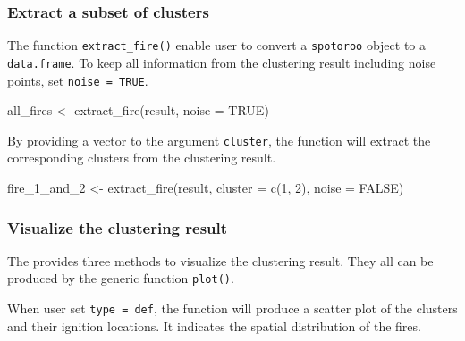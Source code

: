 \hypertarget{extract-a-subset-of-clusters}{%
\subsubsection{Extract a subset of
clusters}\label{extract-a-subset-of-clusters}}

The function \texttt{extract\_fire()} enable user to convert a
\texttt{spotoroo} object to a \texttt{data.frame}. To keep all
information from the clustering result including noise points, set
\texttt{noise\ =\ TRUE}.

\begin{Schunk}
\begin{Sinput}
all_fires <- extract_fire(result, noise = TRUE)
\end{Sinput}
\end{Schunk}

By providing a vector to the argument \texttt{cluster}, the function
will extract the corresponding clusters from the clustering result.

\begin{Schunk}
\begin{Sinput}
fire_1_and_2 <- extract_fire(result, cluster = c(1, 2), noise = FALSE)
\end{Sinput}
\end{Schunk}

\hypertarget{visualize-the-clustering-result}{%
\subsubsection{Visualize the clustering
result}\label{visualize-the-clustering-result}}

The  provides three methods to visualize the
clustering result. They all can be produced by the generic function
\texttt{plot()}.

When user set \texttt{type\ =\ \textquotesingle{}def\textquotesingle{}},
the function will produce a scatter plot of the clusters and their
ignition locations. It indicates the spatial distribution of the fires.


